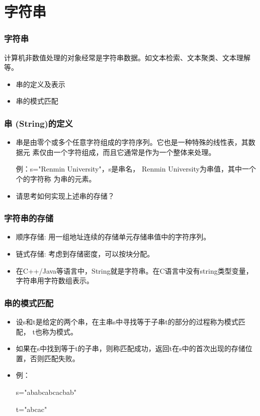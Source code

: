 \section{字符串}
\begin{frame}[fragile]
  \frametitle{字符串}
  计算机非数值处理的对象经常是字符串数据。如文本检索、文本聚类、文本理解等。

  \begin{itemize}
  \item 串的定义及表示
  \item 串的模式匹配
  \end{itemize}
\end{frame}

\begin{frame}[fragile]
  \frametitle{串 (String)的定义}

  \begin{itemize}
  \item 串是由零个或多个任意字符组成的字符序列。它也是一种特殊的线性表，其数据元
    素仅由一个字符组成，而且它通常是作为一个整体来处理。

例：s="Renmin University"，s是串名， Renmin University为串值，其中一个个的字符称
为串的元素。

  \item 请思考如何实现上述串的存储？
  \end{itemize}
\end{frame}

\begin{frame}[fragile]
  \frametitle{字符串的存储}
  \begin{itemize}
  \item 顺序存储: 用一组地址连续的存储单元存储串值中的字符序列。
  \item 链式存储: 考虑到存储密度，可以按块分配。
  \item 在C++/Java等语言中，String就是字符串。在C语言中没有string类型变量，字符串用字符数组表示。
  \end{itemize}
\end{frame}

\begin{frame}[fragile]
  \frametitle{串的模式匹配}
  \begin{itemize}
  \item 设s和t是给定的两个串，在主串s中寻找等于子串t的部分的过程称为模式匹配， t也称为模式。
  \item 如果在s中找到等于t的子串，则称匹配成功，返回t在s中的首次出现的存储位置，否则匹配失败。
  \item 例：

    s="ababcabcacbab"

    t="abcac"
  \end{itemize}
\end{frame}

